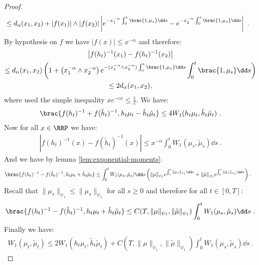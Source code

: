 \begin{proof}
\begin{align*}
        &\leq d_\alpha(x_1,x_2) + \left|f(x_1)| \wedge |f(x_2) \right|\left| e^{-x_1^{-\alpha}\int_0^t \brac{1,\mu_s}\dd s } -e^{-x_2^{-\alpha}\int_0^t \brac{1,\mu_s}\dd s } \right|\ .
    \end{align*}
    By hypothesis on $f$ we have $|f(x)| \leq x^{-\alpha}$ and therefore:
    \begin{multline*}
        \left| f(h_t)^{-1}(x_1) - f(h_t)^{-1}(x_2)\right| \\\leq d_\alpha(x_1,x_2)\left(1 + \left(x_1^{-\alpha}\wedge x_2^{-\alpha} \right)e^{-(x_1^{-\alpha}\wedge x_2^{-\alpha} )\int_0^t \brac{1,\mu_s}\dd s }\int_0^t \brac{1,\mu_s}\dd s \right) \\
        \leq 2d_\alpha(x_1,x_2),
    \end{multline*}
    where used the simple inequality $xe^{-cx} \leq \frac1c$. We have:
    \begin{align*}
        \brac{f(h_t)^{-1} + f(\tilde{h}_t)^{-1}, h_t\mu_t - \tilde{h}_t\tilde{\mu}_t} \leq 4W_1(h_t\mu_t , \tilde{h}_t\tilde{\mu}_t)\ .
    \end{align*}
    Now for all $x \in \RRP$ we have:
    \begin{align*}
        \left|f(h_t)^{-1}(x) - f(\tilde{h}_t)^{-1}(x)\right| \leq x^{-\alpha}\int_0^t W_1(\mu_s,\tilde{\mu}_s) \dd s \ .
    \end{align*}
    And we have by lemma \ref{lem:exponential-moments}:
    \begin{align*}
        \brac{f(h_t)^{-1} - f(\tilde{h}_t)^{-1},h_t\mu_t + \tilde{h}_t\tilde{\mu}_t} &\leq \int_0^t W_1(\mu_s,\tilde{\mu}_s) \dd s \left(\|\mu\|_{\psi_1}e^{\int_0^t \|\mu_s \|_{\psi_1}\dd s} + \|\tilde{\mu}\|_{\psi_1}e^{\int_0^t \|\tilde{\mu}_s \|_{\psi_1}\dd s}\right).
    \end{align*}
    Recall that $\|\mu_s \|_{\psi_1} \leq \|\mu_s \|_{\psi_1}$ for all $s \geq 0$ and therefore for all $t \in [0,T]$:
    \begin{align*}
        \brac{f(h_t)^{-1} - f(\tilde{h}_t)^{-1},h_t\mu_t + \tilde{h}_t\tilde{\mu}_t} \leq C(T,\|\mu\|_{\psi_1},\|\tilde{\mu}\|_{\psi_1})\int_0^t W_1(\mu_s,\tilde{\mu}_s) \dd s\ .
    \end{align*}
    Finally we have:
    \begin{align*}
        W_1(\mu_t,\tilde{\mu}_t) \leq 2W_1(h_t\mu_t , \tilde{h}_t\tilde{\mu}_t) + C(T,\|\mu\|_{\psi_1},\|\tilde{\mu}\|_{\psi_1})\int_0^t W_1(\mu_s,\tilde{\mu}_s) \dd s\ . 
    \end{align*}
    

\end{proof}
